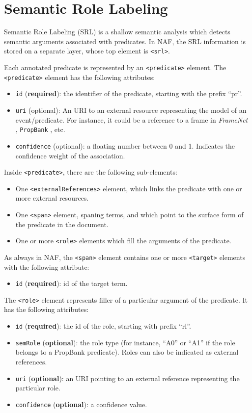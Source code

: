 
\section{Semantic Role Labeling}
\label{sec:semant-role-label}

Semantic Role Labeling (SRL) is a shallow semantic analysis which detects
semantic arguments associated with predicates. In NAF, the SRL information
is stored on a separate layer, whose top element is \texttt{<srl>}.

Each annotated predicate is represented by an \texttt{<predicate>}
element. The \texttt{<predicate>} element has the following attributes:
\begin{itemize}
\item \texttt{id} (\textbf{required}): the identifier of the predicate,
  starting with the prefix ``pr''.
\item \texttt{uri} (optional): An URI to an external resource representing the model of
  an event/predicate. For instance, it could be a reference to a frame in
  \emph{FrameNet} \cite{Baker+'98}, \texttt{PropBank} \cite{propbank02}, etc.
\item \texttt{confidence} (optional): a floating number between 0 and
  1. Indicates the confidence weight of the association.
\end{itemize}


Inside \texttt{<predicate>}, there are the following sub-elements:
\begin{itemize}
\item One \texttt{<externalReferences>} element, which links the predicate
  with one or more external resources.
\item One \texttt{<span>} element, spaning terms, and which point to the
  surface form of the predicate in the document.
\item One or more \texttt{<role>} elements which fill the arguments of the
  predicate.
\end{itemize}

As always in NAF, the \texttt{<span>} element contains one or more
\texttt{<target>} elements with the following attribute:

\begin{itemize}
\item \texttt{id} (\textbf{required}): id of the target term.
\end{itemize}

The \texttt{<role>} element represents filler of a particular argument of
the predicate. It has the following attributes:
\begin{itemize}
\item \texttt{id} (\textbf{required}): the id of the role, starting with
  prefix ``rl''.
\item \texttt{semRole} (\textbf{optional}): the role type (for instance,
  ``A0'' or ``A1'' if the role belongs to a PropBank predicate). Roles can also be indicated as external references.
\item \texttt{uri} (\textbf{optional}): an URI pointing to an external
  reference representing the particular role.
\item \texttt{confidence} (\textbf{optional}): a confidence value.
\end{itemize}


